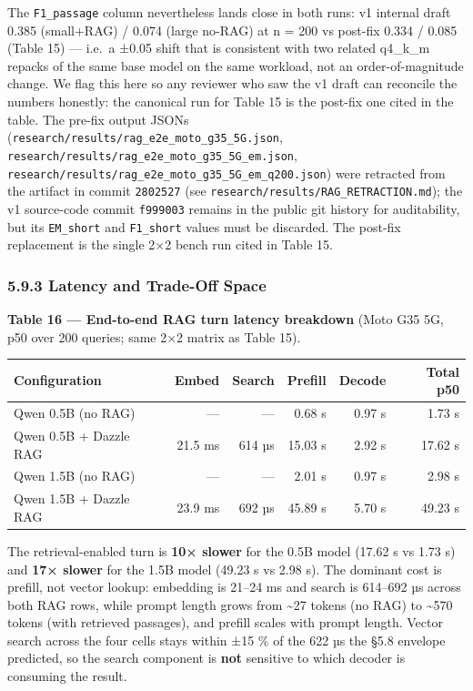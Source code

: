 The \texttt{F1\_passage} column nevertheless lands close in both runs: v1
internal draft 0.385 (small+RAG) / 0.074 (large no-RAG) at n = 200 vs post-fix
0.334 / 0.085 (Table 15) --- i.e.~a ±0.05 shift that is consistent with two
related q4\_k\_m repacks of the same base model on the same workload, not an
order-of-magnitude change. We flag this here so any reviewer who saw the v1
draft can reconcile the numbers honestly: the canonical run for Table 15 is the
post-fix one cited in the table. The pre-fix output JSONs
(\texttt{research/results/rag\_e2e\_moto\_g35\_5G.json},
\texttt{research/results/rag\_e2e\_moto\_g35\_5G\_em.json},
\texttt{research/results/rag\_e2e\_moto\_g35\_5G\_em\_q200.json}) were retracted
from the artifact in commit \texttt{2802527} (see
\texttt{research/results/RAG\_RETRACTION.md}); the v1 source-code commit
\texttt{f999003} remains in the public git history for auditability, but its
\texttt{EM\_short} and \texttt{F1\_short} values must be discarded. The post-fix
replacement is the single 2×2 bench run cited in Table 15.

\subsubsection{5.9.3 Latency and Trade-Off
Space}\label{latency-and-trade-off-space}

\textbf{Table 16 --- End-to-end RAG turn latency breakdown} (Moto G35 5G, p50
over 200 queries; same 2×2 matrix as Table 15).

{\def\LTcaptype{none} %
\begin{longtable}[]{@{}lrrrrr@{}}
\toprule\noalign{}
Configuration & Embed & Search & Prefill & Decode & Total p50 \\
\midrule\noalign{}
\endhead
\bottomrule\noalign{}
\endlastfoot
Qwen 0.5B (no RAG) & --- & --- & 0.68 s & 0.97 s & 1.73 s \\
Qwen 0.5B + Dazzle RAG & 21.5 ms & 614 µs & 15.03 s & 2.92 s & 17.62 s \\
Qwen 1.5B (no RAG) & --- & --- & 2.01 s & 0.97 s & 2.98 s \\
Qwen 1.5B + Dazzle RAG & 23.9 ms & 692 µs & 45.89 s & 5.70 s & 49.23 s \\
\end{longtable}
}

The retrieval-enabled turn is \textbf{10× slower} for the 0.5B model (17.62 s vs
1.73 s) and \textbf{17× slower} for the 1.5B model (49.23 s vs 2.98 s). The
dominant cost is prefill, not vector lookup: embedding is 21--24 ms and search
is 614--692 µs across both RAG rows, while prompt length grows from
\textasciitilde27 tokens (no RAG) to \textasciitilde570 tokens (with retrieved
passages), and prefill scales with prompt length. Vector search across the four
cells stays within ±15 \% of the 622 µs the §5.8 envelope predicted, so the
search component is \textbf{not} sensitive to which decoder is consuming the
result.

